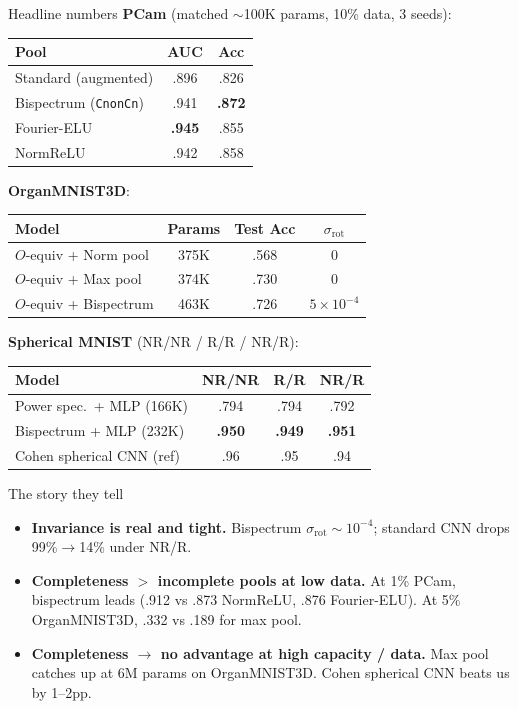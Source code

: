 \documentclass[10pt,aspectratio=169]{beamer}
\begin{document}
\begin{frame}{Headline numbers}
\centering\small
\textbf{PCam} (matched $\sim$100K params, 10\% data, 3 seeds):
\begin{tabular}{lcc}
\toprule
Pool & AUC & Acc \\
\midrule
Standard (augmented) & .896 & .826 \\
Bispectrum (\texttt{CnonCn}) & .941 & \textbf{.872} \\
Fourier-ELU & \textbf{.945} & .855 \\
NormReLU & .942 & .858 \\
\bottomrule
\end{tabular}
\vspace{0.6em}

\textbf{OrganMNIST3D}:
\begin{tabular}{lccc}
\toprule
Model & Params & Test Acc & $\sigma_\mathrm{rot}$ \\
\midrule
$O$-equiv + Norm pool & 375K & .568 & 0 \\
$O$-equiv + Max pool & 374K & .730 & 0 \\
$O$-equiv + Bispectrum & 463K & .726 & $5{\times}10^{-4}$ \\
\bottomrule
\end{tabular}
\vspace{0.6em}

\textbf{Spherical MNIST} (NR/NR / R/R / NR/R):
\begin{tabular}{lccc}
\toprule
Model & NR/NR & R/R & NR/R \\
\midrule
Power spec.\ + MLP (166K) & .794 & .794 & .792 \\
Bispectrum + MLP (232K) & \textbf{.950} & \textbf{.949} & \textbf{.951} \\
Cohen spherical CNN (ref) & .96 & .95 & .94 \\
\bottomrule
\end{tabular}
\end{frame}

\begin{frame}{The story they tell}
\begin{itemize}
  \item \textbf{Invariance is real and tight.} Bispectrum $\sigma_\mathrm{rot}
        \sim 10^{-4}$; standard CNN drops 99\%$\to$14\% under NR/R.
  \item \textbf{Completeness $>$ incomplete pools at low data.}
        At 1\% PCam, bispectrum leads (.912 vs .873 NormReLU, .876 Fourier-ELU).
        At 5\% OrganMNIST3D, .332 vs .189 for max pool.
  \item \textbf{Completeness $\to$ no advantage at high capacity / data.}
        Max pool catches up at 6M params on OrganMNIST3D.
        Cohen spherical CNN beats us by 1--2pp.
\end{itemize}
\end{frame}
\end{document}
